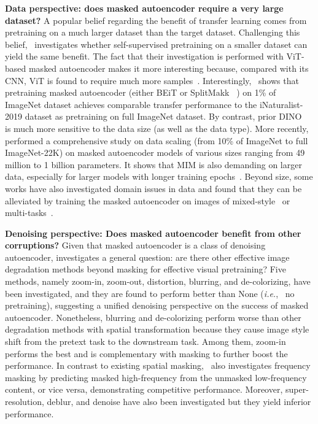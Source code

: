 \documentclass[10pt,journal,compsoc]{IEEEtran}
\begin{document}
\textbf{Data perspective: does masked autoencoder require a very large dataset?} A popular belief regarding the benefit of transfer learning comes from pretraining on a much larger dataset than the target dataset. Challenging this belief,~\cite{el2021large} investigates whether self-supervised pretraining on a smaller dataset can yield the same benefit. The fact that their investigation is performed with ViT-based masked autoencoder makes it more interesting because, compared with its CNN, ViT is found to require much more samples~\cite{dosovitskiy2021an}. Interestingly,~\cite{dosovitskiy2021an} shows that pretraining masked autoencoder (either BEiT or SplitMakk~\cite{el2021large} ) on 1\% of ImageNet dataset achieves comparable transfer
performance to the iNaturalist-2019 dataset as pretraining on full ImageNet dataset. By contrast, prior DINO~\cite{caron2021emerging} is much more sensitive to the data size (as well as the data type). More recently,~\cite{xie2022data} performed a comprehensive study on data scaling (from 10\% of ImageNet to full ImageNet-22K) on masked autoencoder models of various sizes ranging from 49 million to 1 billion parameters. It shows that MIM is also demanding on larger data, especially for larger models with longer training epochs~\cite{xie2022data}. Beyond size, some works have also investigated domain issues in data and found that they can be alleviated by training the masked autoencoder on images of mixed-style~\cite{yang2022domain} or multi-tasks~\cite{bachmann2022multimae}. 




\textbf{Denoising perspective: Does masked autoencoder benefit from other corruptions?} Given that masked autoencoder is a class of denoising autoencoder, \cite{tian2022beyond} investigates a general question: are there other effective image degradation methods beyond masking for effective visual pretraining? Five methods, namely zoom-in, zoom-out, distortion, blurring, and de-colorizing, have been investigated, and they are found to perform better than None (\textit{i.e.}, \ no pretraining), suggesting a unified denoising perspective on the success of masked autoencoder. Nonetheless, blurring and de-colorizing perform worse than other degradation methods with spatial transformation because they cause image style shift from the pretext task to the downstream task. Among them, zoom-in performs the best and is complementary with masking to further boost the performance. In contrast to existing spatial masking,~\cite{xie2022masked} also investigates frequency masking by predicting masked high-frequency from the unmasked low-frequency content, or vice versa, demonstrating competitive performance. Moreover, super-resolution, deblur, and denoise have also been investigated but they yield inferior performance. 
\end{document}
